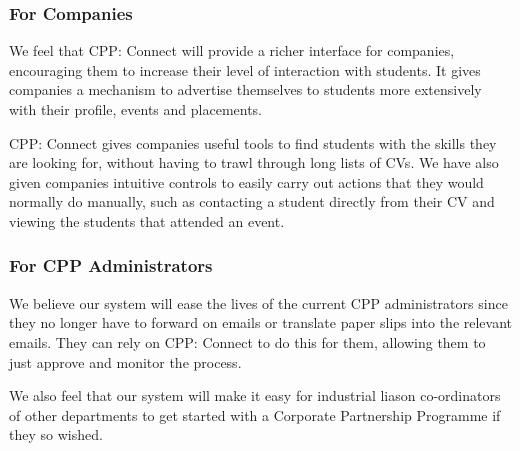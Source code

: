 \subsubsection{For Companies}
We feel that CPP: Connect will provide a richer interface for companies, encouraging them to increase their level of interaction with students. It gives companies a mechanism to advertise themselves to students more extensively with their profile, events and placements.

CPP: Connect gives companies useful tools to find students with the skills they are looking for, without having to trawl through long lists of CVs. We have also given companies intuitive controls to easily carry out actions that they would normally do manually, such as contacting a student directly from their CV and viewing the students that attended an event.

\subsubsection{For CPP Administrators}
We believe our system will ease the lives of the current CPP administrators since they no longer have to forward on emails or translate paper slips into the relevant emails. They can rely on CPP: Connect to do this for them, allowing them to just approve and monitor the process.

We also feel that our system will make it easy for industrial liason co-ordinators of other departments to get started with a Corporate Partnership Programme if they so wished.
